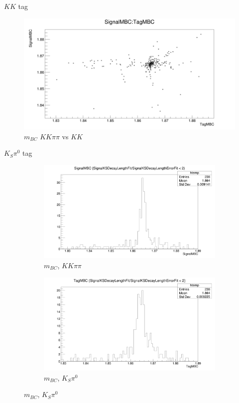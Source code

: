 \documentclass{beamer}
\begin{document}
\begin{frame}{$KK$ tag}
  \begin{figure}
    \centering
    \includegraphics[width=\textwidth]{KKDoubleTag_ScatterPlotMBC.png}
    \caption{$m_{BC}$ $KK\pi\pi$ vs $KK$}
  \end{figure}
\end{frame}

\begin{frame}{$K_S\pi^0$ tag}
  \begin{figure}
    \centering
    \begin{subfigure}{0.5\textwidth}
      \centering
      \includegraphics[width=\textwidth]{KSpi0DoubleTag_SignalMBC.png}
      \caption{$m_{BC}$, $KK\pi\pi$}
    \end{subfigure}%
    \begin{subfigure}{0.5\textwidth}
      \centering
      \includegraphics[width=\textwidth]{KSpi0DoubleTag_TagMBC.png}
      \caption{$m_{BC}$, $K_S\pi^0$}
    \end{subfigure}
  \end{figure}
\end{frame}
\end{document}
